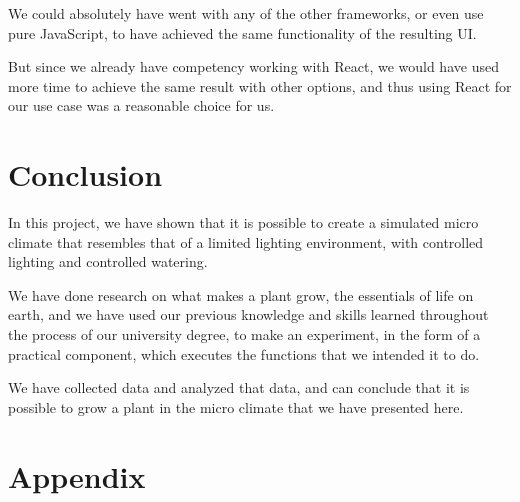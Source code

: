 \documentclass[a4paper,12pt,twoside,openright,titlepage]{book}
\begin{document}
We could absolutely have went with any of the other frameworks, or even use pure JavaScript, to have achieved the same functionality of the resulting UI.

But since we already have competency working with React, we would have used more time to achieve the same result with other options, and thus using React for our use case was a reasonable choice for us.

\chapter{Conclusion}
In this project, we have shown that it is possible to create a simulated micro climate that resembles that of a limited lighting environment, with controlled lighting and controlled watering.

We have done research on what makes a plant grow, the essentials of life on earth, and we have used our previous knowledge and skills learned throughout the process of our university degree, to make an experiment, in the form of a practical component, which executes the functions that we intended it to do.

We have collected data and analyzed that data, and can conclude that it is possible to grow a plant in the micro climate that we have presented here.

\appendix
\cleardoublepage{}
\chapter{Appendix}
\backmatter
\cleardoublepage{}


\end{document}
